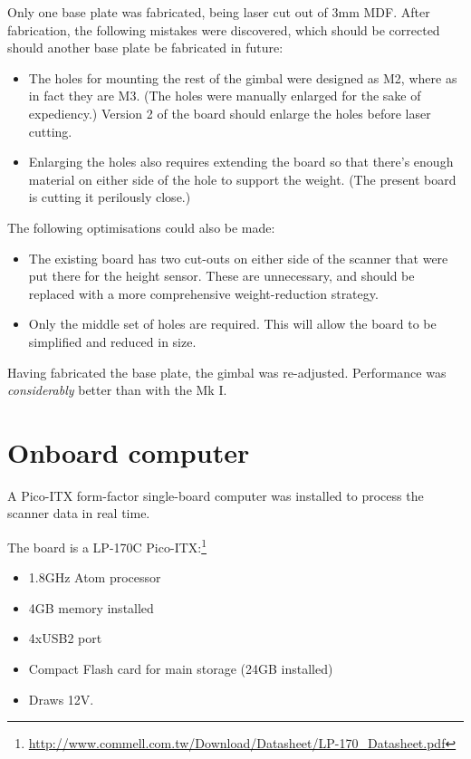 \documentclass[12pt,oneside,a4paper,draft]{book}
\begin{document}
Only one base plate was fabricated, being laser cut out of 3mm
MDF. After fabrication, the following mistakes were discovered, which
should be corrected should another base plate be fabricated in future:
\begin{itemize}
\item The holes for mounting the rest of the gimbal were designed as
  M2, where as in fact they are M3. (The holes were manually enlarged
  for the sake of expediency.) Version 2 of the board should enlarge
  the holes before laser cutting.
\item Enlarging the holes also requires extending the board so that
  there's enough material on either side of the hole to support the
  weight. (The present board is cutting it perilously close.)
\end{itemize}

The following optimisations could also be made:
\begin{itemize}
\item The existing board has two cut-outs on either side of the
  scanner that were put there for the height sensor. These are
  unnecessary, and should be replaced with a more comprehensive
  weight-reduction strategy.
\item Only the middle set of holes are required. This will allow the
  board to be simplified and reduced in size.
\end{itemize}

Having fabricated the base plate, the gimbal was
re-adjusted. Performance was \emph{considerably} better than with the
Mk I.
\newpage
\section{Onboard computer}
\label{sec:onboard-computer}

A Pico-ITX form-factor single-board computer was installed to process
the scanner data in real time. 

The board is a LP-170C Pico-ITX:\footnote{\url{http://www.commell.com.tw/Download/Datasheet/LP-170_Datasheet.pdf}}
\begin{itemize}
\item 1.8GHz Atom processor
\item 4GB memory installed
\item 4xUSB2 port
\item Compact Flash card for main storage (24GB installed)
\item Draws 12V.
\end{itemize}
\end{document}
